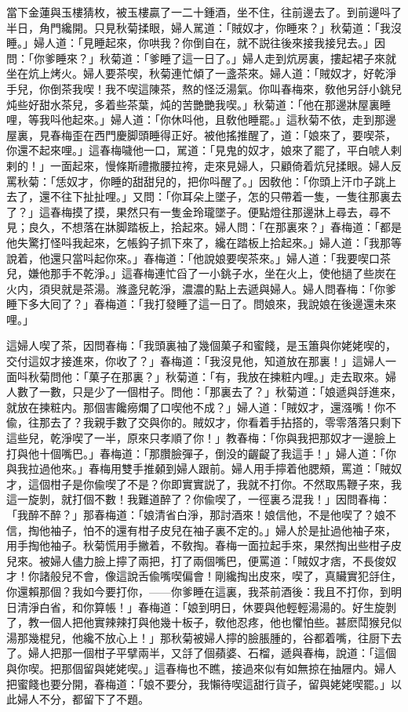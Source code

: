 當下金蓮與玉樓猜枚，被玉樓贏了一二十鍾酒，坐不住，往前邊去了。到前邊呌了半日，角門纔開。只見秋菊揉眼，婦人駡道：「賊奴才，你睡來？」秋菊道：「我沒睡。」婦人道：「見睡起來，你哄我？你倒自在，就不説往後來接我接兒去。」因問：「你爹睡來？」秋菊道：「爹睡了這一日了。」婦人走到炕房裏，摟起裙子來就坐在炕上烤火。婦人要茶喫，秋菊連忙傾了一盞茶來。婦人道：「賊奴才，好乾淨手兒，你倒茶我喫！我不喫這陳茶，熬的怪泛湯氣。你叫春梅來，敎他另㧱小銚兒炖些好甜水茶兒，多着些茶葉，炖的苦艷艷我喫。」秋菊道：「他在那邊牀屋裏睡哩，等我呌他起來。」婦人道：「你休呌他，且敎他睡罷。」這秋菊不依，走到那邊屋裏，見春梅歪在西門慶脚頭睡得正好。被他搖推醒了，道：「娘來了，要喫茶，你還不起來哩。」這春梅噦他一口，駡道：「見鬼的奴才，娘來了罷了，平白唬人剌剌的！」一面起來，慢條斯禮撒腰拉袴，走來見婦人，只顧倚着炕兒揉眼。婦人反罵秋菊：「恁奴才，你睡的甜甜兒的，把你呌醒了。」因敎他：「你頭上汗巾子跳上去了，還不往下扯扯哩。」又問：「你耳朵上墜子，怎的只帶着一隻，一隻往那裏去了？」這春梅摸了摸，果然只有一隻金玲瓏墜子。便點燈往那邊牀上尋去，尋不見；良久，不想落在牀脚踏板上，拾起來。婦人問：「在那裏來？」春梅道：「都是他失驚打怪呌我起來，乞帳鈎子抓下來了，纔在踏板上拾起來。」婦人道：「我那等說着，他還只當呌起你來。」春梅道：「他說娘要喫茶來。」婦人道：「我要喫口茶兒，嫌他那手不乾淨。」這春梅連忙舀了一小銚子水，坐在火上，使他撾了些炭在火内，須臾就是茶湯。滌盞兒乾淨，濃濃的點上去遞與婦人。婦人問春梅：「你爹睡下多大囘了？」春梅道：「我打發睡了這一日了。問娘來，我說娘在後邊還未來哩。」

這婦人喫了茶，因問春梅：「我頭裏袖了幾個菓子和蜜餞，是玉簫與你姥姥喫的，交付這奴才接進來，你收了？」春梅道：「我沒見他，知道放在那裏！」這婦人一面呌秋菊問他：「菓子在那裏？」秋菊道：「有，我放在揀粧内哩。」走去取來。婦人數了一數，只是少了一個柑子。問他：「那裏去了？」秋菊道：「娘遞與㧱進來，就放在揀粧内。那個害饞癆爛了口喫他不成？」婦人道：「賊奴才，還漒嘴！你不偸，往那去了？我親手數了交與你的。賊奴才，你看着手拈搭的，零零落落只剩下這些兒，乾淨喫了一半，原來只孝順了你！」教春梅：「你與我把那奴才一邊臉上打與他十個嘴巴。」春梅道：「那臢臉彈子，倒没的齷齪了我這手！」婦人道：「你與我拉過他來。」春梅用雙手推顙到婦人跟前。婦人用手擰着他腮頰，罵道：「賊奴才，這個柑子是你偸喫了不是？你即實實説了，我就不打你。不然取馬鞭子來，我這一旋剝，就打個不數！我難道醉了？你偸喫了，一徑裏ろ混我！」因問春梅：「我醉不醉？」那春梅道：「娘清省白淨，那討酒來！娘信他，不是他喫了？娘不信，掏他袖子，怕不的還有柑子皮兒在袖子裏不定的。」婦人於是扯過他袖子來，用手掏他袖子。秋菊慌用手撇着，不敎掏。春梅一面拉起手來，果然掏出些柑子皮兒來。被婦人儘力臉上擰了兩把，打了兩個嘴巴，便罵道：「賊奴才痞，不長俊奴才！你諸般兒不會，像這說舌偸嘴喫偏會！剛纔掏出皮來，喫了，真贜實犯㧱住，你還賴那個？我如今要打你，——你爹睡在這裏，我茶前酒後：我且不打你，到明日清淨白省，和你算帳！」春梅道：「娘到明日，休要與他輕輕湯湯的。好生旋剝了，教一個人把他實辣辣打與他幾十板子，敎他忍疼，他也懼怕些。甚麽鬦猴兒似湯那幾棍兒，他纔不放心上！」那秋菊被婦人擰的臉脹腫的，谷都着嘴，往厨下去了。婦人把那一個柑子平擘兩半，又㧱了個蘋婆、石榴，遞與春梅，說道：「這個與你喫。把那個留與姥姥喫。」這春梅也不瞧，接過來似有如無掠在抽屜内。婦人把蜜餞也要分開，春梅道：「娘不要分，我懶待喫這甜行貨子，留與姥姥喫罷。」以此婦人不分，都留下了不題。

